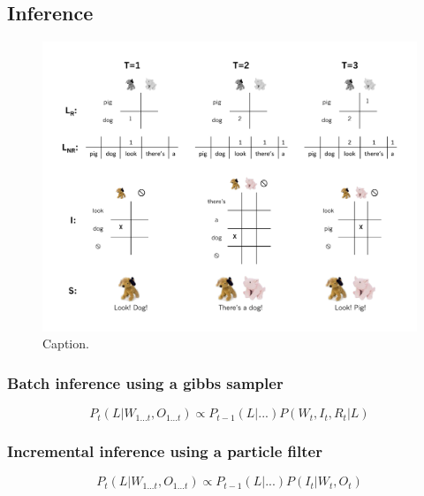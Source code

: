 \documentclass[man,noapacite,12pt]{apa2}
\begin{document}
\subsection{Inference}
\begin{figure}[tr]
\begin{center}
\includegraphics[width=6.5in]{figures/inference_diagram.pdf}
\caption{\label{fig:inference_diagram} Caption.}
\end{center}
\end{figure}

\subsubsection{Batch inference using a gibbs sampler}

\begin{equation}
P_t(L|W_{1...t}, O_{1...t}) \propto P_{t-1}(L | ...) P(W_t, I_t, R_t | L)
\end{equation}


\subsubsection{Incremental inference using a particle filter}

\begin{equation}
P_t(L|W_{1...t}, O_{1...t}) \propto P_{t-1}(L | ...) P(I_t | W_t, O_t)
\end{equation}
\end{document}
